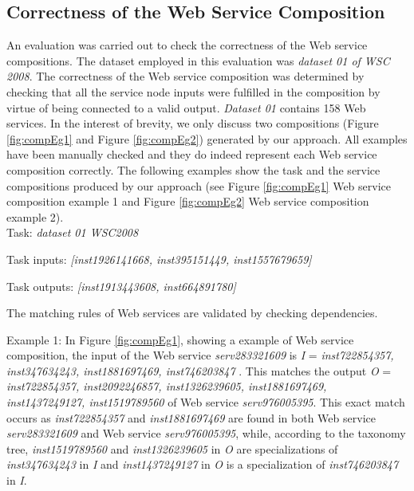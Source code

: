 \subsection{Correctness of the Web Service Composition} 
An evaluation was carried out to check the correctness of the Web service compositions. The dataset employed in this evaluation was \emph{dataset 01 of WSC 2008}. The correctness of the Web service composition was determined by checking that all the service node inputs were fulfilled in the composition by virtue of being connected to a valid output. \emph{Dataset 01} contains 158 Web services. In the interest of brevity, we only discuss two compositions (Figure \ref{fig:compEg1} and Figure \ref{fig:compEg2}) generated by our approach. All examples have been manually checked and they do indeed represent each Web service composition correctly. The following examples show the task and the service compositions produced by our approach (see Figure \ref{fig:compEg1} Web service composition example 1 and Figure \ref{fig:compEg2} Web service composition example 2).\\

Task: \emph{dataset 01 WSC2008}\par
Task inputs: \emph{[inst1926141668, inst395151449, inst1557679659]}\par
Task outputs: \emph{[inst1913443608, inst664891780]}\\\par

The matching rules of Web services are validated by checking dependencies.\par
Example 1: In Figure \ref{fig:compEg1}, showing a example of Web service composition, the input of the Web service \emph{serv283321609} is \emph{I} = \emph{{ inst722854357, inst347634243, inst1881697469, inst746203847 }}. This matches the output  \emph{O} = \emph{{inst722854357, inst2092246857, inst1326239605, inst1881697469, inst1437249127, inst1519789560 }} of Web service  \emph{serv976005395}. This exact match occurs as \emph{inst722854357} and \emph{inst1881697469} are found in both Web service \emph{serv283321609} and Web service \emph{serv976005395}, while,  according to the taxonomy tree, \emph{inst1519789560} and \emph{inst1326239605} in \emph{O} are specializations of \emph{inst347634243} in \emph{I} and \emph{inst1437249127} in \emph{O} is a specialization of \emph{inst746203847} in \emph{I}.\par

